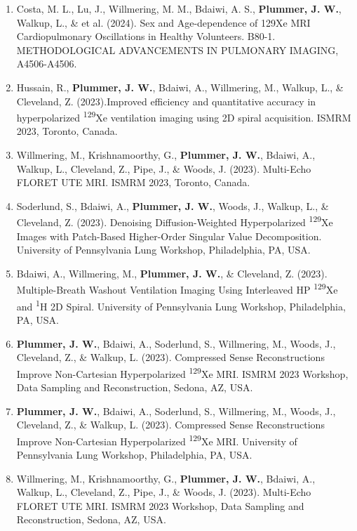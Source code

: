 \documentclass[12pt,]{scrartcl}
\begin{document}
\begin{enumerate}
    \item Costa, M. L., Lu, J., Willmering, M. M., Bdaiwi, A. S., \textbf{Plummer, J. W.}, Walkup, L., \& et al. (2024). Sex and Age-dependence of 129Xe MRI Cardiopulmonary Oscillations in Healthy Volunteers. B80-1. METHODOLOGICAL ADVANCEMENTS IN PULMONARY IMAGING, A4506-A4506.

    \item Hussain, R., \textbf{Plummer, J. W.}, Bdaiwi, A., Willmering, M., Walkup, L., \& Cleveland, Z. (2023).Improved efficiency and quantitative accuracy in hyperpolarized \textsuperscript{129}Xe ventilation imaging using 2D spiral acquisition. ISMRM 2023, Toronto, Canada.
    
  \item Willmering, M., Krishnamoorthy, G., \textbf{Plummer, J. W.}, Bdaiwi, A., Walkup, L., Cleveland, Z., Pipe, J., \& Woods, J. (2023). Multi-Echo FLORET UTE MRI. ISMRM 2023, Toronto, Canada.

  \item Soderlund, S., Bdaiwi, A., \textbf{Plummer, J. W.}, Woods, J., Walkup, L., \& Cleveland, Z. (2023). Denoising Diffusion-Weighted Hyperpolarized \textsuperscript{129}Xe Images with Patch-Based Higher-Order Singular Value Decomposition. University of Pennsylvania Lung Workshop, Philadelphia, PA, USA.
  
  \item Bdaiwi, A., Willmering, M., \textbf{Plummer, J. W.}, \& Cleveland, Z. (2023). Multiple-Breath Washout Ventilation Imaging Using Interleaved HP \textsuperscript{129}Xe and \textsuperscript{1}H 2D Spiral. University of Pennsylvania Lung Workshop, Philadelphia, PA, USA.
  
  \item \textbf{Plummer, J. W.}, Bdaiwi, A., Soderlund, S., Willmering, M., Woods, J., Cleveland, Z., \& Walkup, L. (2023). Compressed Sense Reconstructions Improve Non-Cartesian Hyperpolarized \textsuperscript{129}Xe MRI. ISMRM 2023 Workshop, Data Sampling and Reconstruction, Sedona, AZ, USA.  
  
  \item \textbf{Plummer, J. W.}, Bdaiwi, A., Soderlund, S., Willmering, M., Woods, J., Cleveland, Z., \& Walkup, L. (2023). Compressed Sense Reconstructions Improve Non-Cartesian Hyperpolarized \textsuperscript{129}Xe MRI. University of Pennsylvania Lung Workshop, Philadelphia, PA, USA.  
  
  \item Willmering, M., Krishnamoorthy, G., \textbf{Plummer, J. W.}, Bdaiwi, A., Walkup, L., Cleveland, Z., Pipe, J., \& Woods, J. (2023). Multi-Echo FLORET UTE MRI. ISMRM 2023 Workshop, Data Sampling and Reconstruction, Sedona, AZ, USA.  
  

\end{enumerate}
\end{document}
